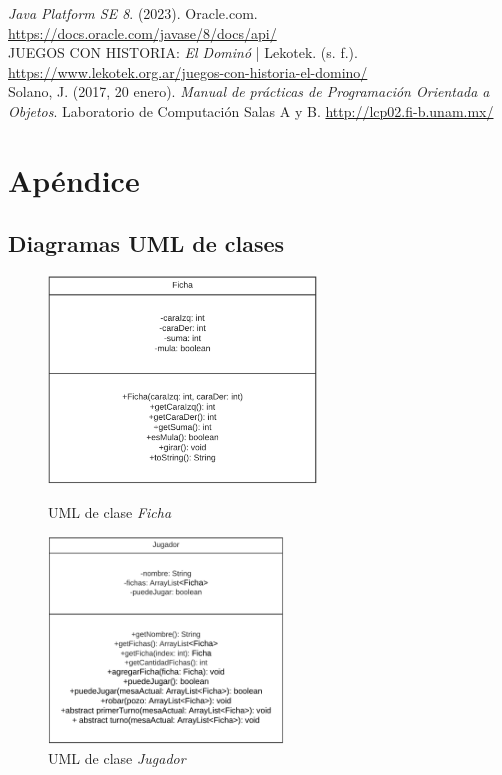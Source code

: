 \documentclass[12pt]{article}
\begin{document}
  \textit{Java Platform SE 8}. (2023). Oracle.com. \url{https://docs.oracle.com/javase/8/docs/api/} \\

  JUEGOS CON HISTORIA: \textit{El Dominó} | Lekotek. (s. f.). \url{https://www.lekotek.org.ar/juegos-con-historia-el-domino/} \\

  Solano, J. (2017, 20 enero). \textit{Manual de prácticas de Programación Orientada a Objetos}. Laboratorio de Computación Salas A y B. \url{http://lcp02.fi-b.unam.mx/} 

  \newpage
  \section{Apéndice}
  \subsection{Diagramas UML de clases}
  \begin{figure}[h!]
    \centering
    \begin{minipage}[l]{0.45\textwidth}
      \centering
      \includegraphics[height=5.5cm]{uml1.png}
      \caption{UML de clase \textit{Ficha}}
    \end{minipage}
    \begin{minipage}[r]{0.45\textwidth}
      \centering
      \includegraphics[height=5.5cm]{uml2.png}
      \caption{UML de clase \textit{Jugador}}
    \end{minipage}
  \end{figure}
\end{document}
